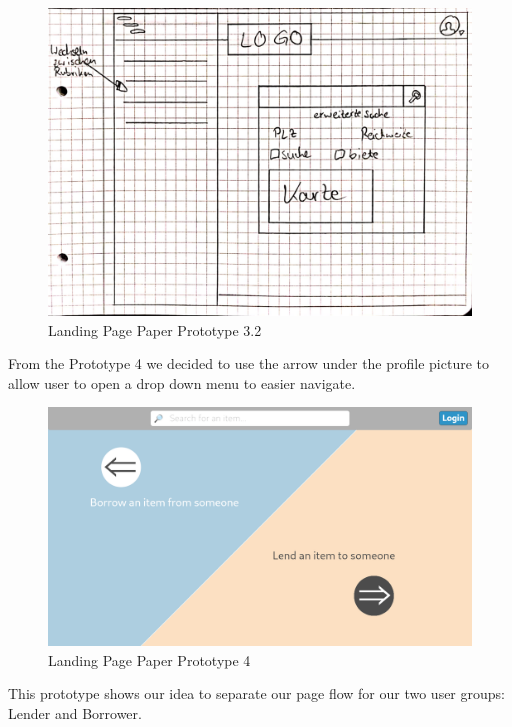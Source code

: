 			
			\begin{figure}[H]
				\centering
				\includegraphics[width=0.9\linewidth]{abb/6_Sketching and Paper Prototyping/Homepage4.png}
				\caption{Landing Page Paper Prototype 3.2}
				\label{fig:Homepage4}
			\end{figure}
			
			\noindent
			From the Prototype 4 we decided to use the arrow under the profile picture to allow user to open a drop down menu to easier navigate.
			
			\begin{figure}[H]
				\centering
				\includegraphics[width=\linewidth]{abb/6_Sketching and Paper Prototyping/Homepage5.png}
				\caption{Landing Page Paper Prototype 4}
				\label{fig:Homepage4}
			\end{figure}
			
			\noindent
			This prototype shows our idea to separate our page flow for our two user groups: Lender and Borrower.
			